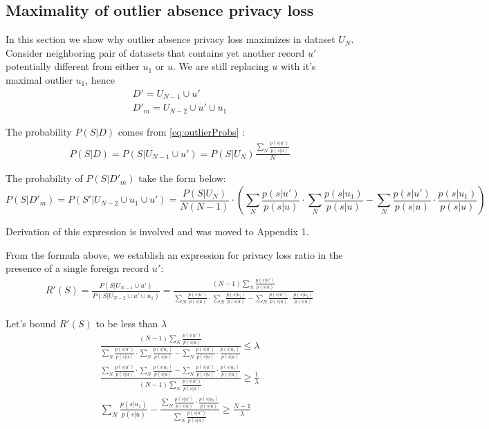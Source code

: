 \documentclass[11pt]{article}
\begin{document}
\subsection{Maximality of outlier absence privacy loss}

In this section we show why outlier absence privacy loss maximizes in dataset $U_N$.  Consider neighboring pair of datasets that contains yet another record $u'$ potentially different from either $u_1$ or $u$.  We are still replacing $u$ with it's maximal outlier $u_1$, hence
\begin{align}
D' = U_{N-1} \cup u' \\
D'_m =  U_{N-2} \cup u' \cup u_1
\end{align}

The probability $P(S|D)$ comes from \eqref{eq:outlierProbs} :
\begin{align}
P(S|D) = P(S|U_{N-1} \cup u') =  P(S|U_N)  \frac{\sum_N  \frac{ p(s | u') } { p(s | u) }}{N}
\end{align}

The probability of $P(S|D'_m)$ take the form below:
 \begin{equation}  
P(S|D'_m) = P(S'|U_{N-2} \cup u_1 \cup u' ) =  \frac{P(S|U_{N})}{N(N-1)} \cdot \left (  \sum_N  \frac{ p(s | u') } { p(s | u) } \cdot  \sum_N \frac{ p(s | u_1) } { p(s | u)}   - \sum_N  \frac{ p(s | u') } { p(s | u) } \cdot \frac{ p(s | u_1) } { p(s | u)}  \right )
\end{equation}

Derivation of this expression is involved and was moved to Appendix 1.

From the formula above, we establish an expression for privacy loss ratio in the presence of a single foreign record $u'$:
\begin{align}
R'(S) = \frac{P(S|U_{N-1} \cup u')}{P(S|U_{N-2} \cup u' \cup u_1 )} = \frac{ (N-1)  \sum_N  \frac{ p(s | u') } { p(s | u) } } 
{ \sum_N  \frac{ p(s | u') } { p(s | u) } \cdot  \sum_N \frac{ p(s | u_1) } { p(s | u)}   - \sum_N  \frac{ p(s | u') } { p(s | u) } \cdot \frac{ p(s | u_1) } { p(s | u)}  }
\end{align}

Let's bound $R'(S)$ to be less than $\lambda$
\begin{align}
\frac{ (N-1)  \sum_N  \frac{ p(s | u') } { p(s | u) } } 
{  \sum_N  \frac{ p(s | u') } { p(s | u) } \cdot  \sum_N \frac{ p(s | u_1) } { p(s | u)}   - \sum_N  \frac{ p(s | u') } { p(s | u) } \cdot \frac{ p(s | u_1) } { p(s | u)}   }  \le \lambda \\
\frac {\sum_N  \frac{ p(s | u') } { p(s | u) } \cdot  \sum_N \frac{ p(s | u_1) } { p(s | u)}   - \sum_N  \frac{ p(s | u') } { p(s | u) } \cdot \frac{ p(s | u_1) } { p(s | u)}   }  { (N-1)  \sum_N  \frac{ p(s | u') } { p(s | u) } }  \ge \frac{1}{\lambda} \\
\sum_N \frac{ p(s | u_1) } { p(s | u)}   - \frac{ \sum_N  \frac{ p(s | u') } { p(s | u) } \cdot \frac{ p(s | u_1) } { p(s | u)}  }  {  \sum_N  \frac{ p(s | u') } { p(s | u) } }  \ge \frac{N-1}{\lambda} 
\end{align}
\end{document}
